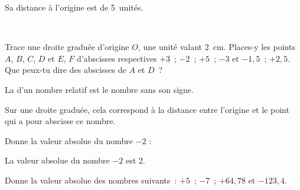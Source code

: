 \begin{methode*1}
\begin{exemple*1}
\begin{minipage}[c]{0.4\linewidth}
  Sa distance à l'origine est de 5 unités.
   \end{minipage} \\


\end{exemple*1}


\exercice
Trace une droite graduée d'origine $O$, une unité valant 2 cm. Places-y les points $A$, $B$, $C$, $D$ et  $E$, $F$ d'abscisses respectives $+3$ ; $-2$ ; $+5$ ; $-3$ et $-1,5$ ; $+2,5$. Que peux-tu dire des abscisses de $A$ et $D$ ?

\end{methode*1}



\newpage

\begin{definition}
La  d'un nombre relatif est le nombre sans son signe.

Sur une droite graduée, cela correspond à la distance entre l'origine et le point qui a pour abscisse ce nombre.
\end{definition}

\vspace{4em}

\begin{methode*1}


\begin{exemple*1}
Donne la valeur absolue du nombre $-2$ :

La valeur absolue du nombre $-2$ est 2.
\end{exemple*1}


\exercice
Donne la valeur absolue des nombres suivants : $+5$ ; $-7$ ; $+64,78$ et $-123,4$.

\end{methode*1}


